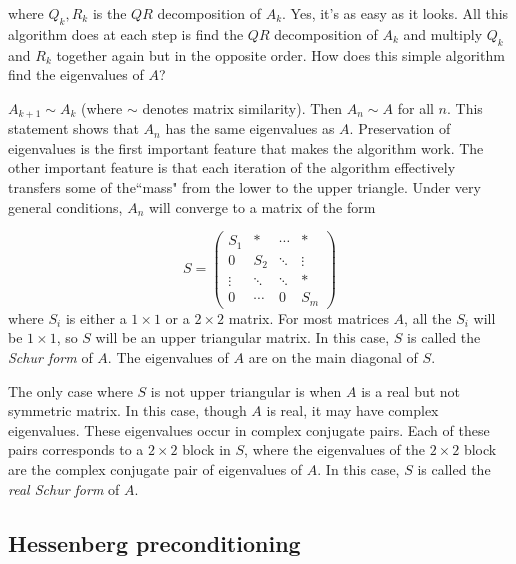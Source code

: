 where $Q_k, R_k$ is the $QR$ decomposition of $A_k$.
Yes, it's as easy as it looks.
All this algorithm does at each step is find the $QR$ decomposition of $A_k$ and multiply $Q_k$ and $R_k$ together again but in the opposite order.
How does this simple algorithm find the eigenvalues of $A$?

\begin{comment}
\begin{problem}
\label{problem:similarity proof}
Prove that $A_{k+1} \sim A_k$ (where $\sim$ denotes matrix similarity).
Then prove that $A_n \sim A$ for all $n$.
\end{problem}
\end{comment}

$A_{k+1} \sim A_k$ (where $\sim$ denotes matrix similarity).
Then $A_n \sim A$ for all $n$.
This statement shows that $A_n$ has the same eigenvalues as $A$.
Preservation of eigenvalues is the first important feature that makes the algorithm work.
The other important feature is that each iteration of the algorithm effectively transfers some of the``mass" from the lower to the upper triangle.
Under very general conditions, $A_n$ will converge to a matrix of the form

\begin{equation*}
\label{eq:Schur form}
S = 
     \begin{pmatrix}
          S_1 &* & \cdots & * \\
           0     &S_2  &  \ddots & \vdots \\
           \vdots  & \ddots & \ddots & *  \\
           0 & \cdots & 0 & S_m
    \end{pmatrix}
\end{equation*}
where $S_i$ is either a $1 \times 1$ or a $2 \times 2$ matrix.
For most matrices $A$, all the $S_i$ will be $1 \times 1$, so $S$ will be an upper triangular matrix.
In this case, $S$ is called the \emph{Schur form} of $A$.
The eigenvalues of $A$ are on the main diagonal of $S$.

The only case where $S$ is not upper triangular is when $A$ is a real but not symmetric matrix.
In this case, though $A$ is real, it may have complex eigenvalues.
These eigenvalues occur in complex conjugate pairs.
Each of these pairs corresponds to a $2 \times 2$ block in $S$, where the eigenvalues of the $2 \times 2$ block are the complex conjugate pair of eigenvalues of $A$.
In this case, $S$ is called the \emph{real Schur form} of $A$.

\subsection*{Hessenberg preconditioning}


